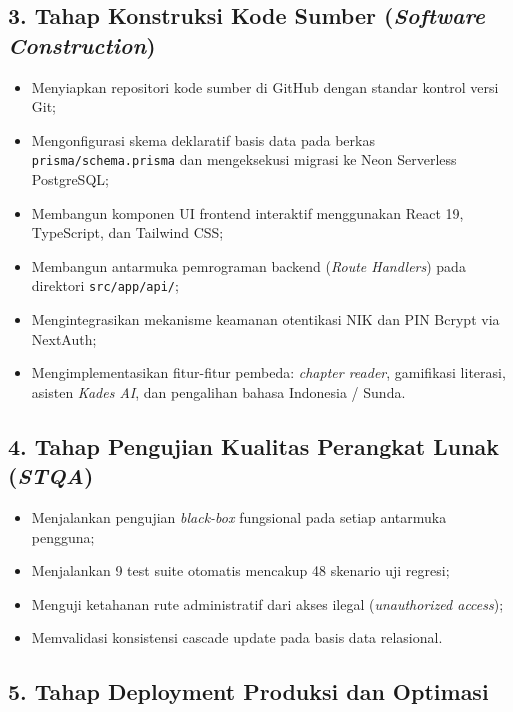 \documentclass[
  indonesian,
  12pt,
]{report}
\providecommand{\tightlist}{%
  \setlength{\itemsep}{0pt}\setlength{\parskip}{0pt}}
\begin{document}
\subsection{\texorpdfstring{3. Tahap Konstruksi Kode Sumber
(\emph{Software
Construction})}{3. Tahap Konstruksi Kode Sumber (Software Construction)}}\label{tahap-konstruksi-kode-sumber-software-construction}

\begin{itemize}
\tightlist
\item
  Menyiapkan repositori kode sumber di GitHub dengan standar kontrol
  versi Git;
\item
  Mengonfigurasi skema deklaratif basis data pada berkas
  \texttt{prisma/schema.prisma} dan mengeksekusi migrasi ke Neon
  Serverless PostgreSQL;
\item
  Membangun komponen UI frontend interaktif menggunakan React 19,
  TypeScript, dan Tailwind CSS;
\item
  Membangun antarmuka pemrograman backend (\emph{Route Handlers}) pada
  direktori \texttt{src/app/api/};
\item
  Mengintegrasikan mekanisme keamanan otentikasi NIK dan PIN Bcrypt via
  NextAuth;
\item
  Mengimplementasikan fitur-fitur pembeda: \emph{chapter reader},
  gamifikasi literasi, asisten \emph{Kades AI}, dan pengalihan bahasa
  Indonesia / Sunda.
\end{itemize}

\subsection{\texorpdfstring{4. Tahap Pengujian Kualitas Perangkat Lunak
(\emph{STQA})}{4. Tahap Pengujian Kualitas Perangkat Lunak (STQA)}}\label{tahap-pengujian-kualitas-perangkat-lunak-stqa}

\begin{itemize}
\tightlist
\item
  Menjalankan pengujian \emph{black-box} fungsional pada setiap
  antarmuka pengguna;
\item
  Menjalankan 9 test suite otomatis mencakup 48 skenario uji regresi;
\item
  Menguji ketahanan rute administratif dari akses ilegal
  (\emph{unauthorized access});
\item
  Memvalidasi konsistensi cascade update pada basis data relasional.
\end{itemize}

\subsection{5. Tahap Deployment Produksi dan
Optimasi}\label{tahap-deployment-produksi-dan-optimasi}
\end{document}
